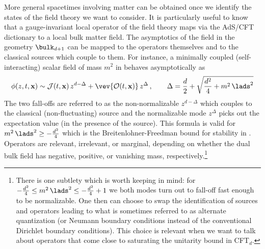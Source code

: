 \documentclass[12pt,openany]{book}
\begin{document}
More general spacetimes involving matter can be obtained once we identify the states of the field theory we want to consider. It is particularly useful to know that a gauge-invariant local operator of the field theory maps via the AdS/CFT dictionary to a local bulk matter field. The asymptotics of the field in the geometry $\bulk_{d+1}$ can be mapped to the operators themselves and to the classical sources which couple to them. For instance, a minimally coupled (self-interacting) scalar field of mass $m^2$ in   behaves asymptotically as
%
\begin{equation}
\phi(z,t,{{\bf x}}) \sim {\cal J}(t,{\bf x})\, z^{d-\Delta} + \vev{{\cal O}(t,{\bf x})} \, z^\Delta \,, \qquad \Delta = \frac{d}{2} + \sqrt{\frac{d^2}{4} + m^2\, \lads^2}
\label{eq:asyphi}
\end{equation}
%
The two fall-offs are referred to as the non-normalizable $z^{d-\Delta}$ which couples to the classical (non-fluctuating) source and  the normalizable mode $z^\Delta$ picks out the expectation value (in the presence of the source).
This formula is valid for $m^2\, \lads^2 \geq -\frac{d^2}{4}$ which is the Breitenlohner-Freedman bound for stability in . Operators are relevant, irrelevant, or marginal, depending on whether the dual bulk field has negative, positive, or vanishing mass, respectively.\footnote{ There is one subtlety which is worth keeping in mind: for $-\frac{d^2}{4}\leq m^2\,\lads^2 \leq -\frac{d^2}{4}+1$ we both modes turn out to fall-off fast enough to be normalizable. One then can choose to swap the identification of sources and operators leading to what is sometimes referred to as alternate quantization (or Neumann boundary conditions instead of the conventional Dirichlet boundary conditions). This choice is relevant when we want to talk about operators that come close to saturating the unitarity bound in CFT$_d$.}
\end{document}
